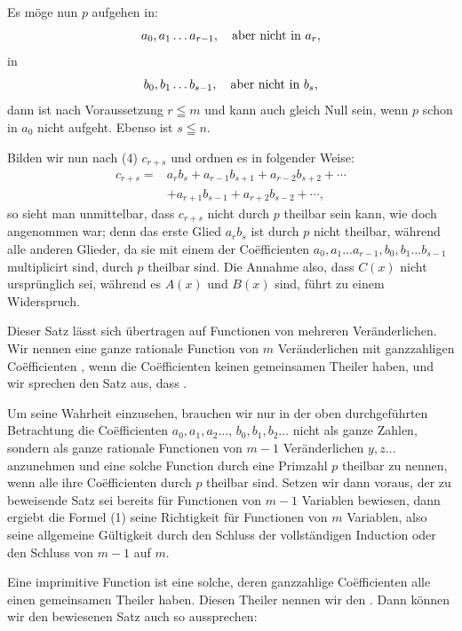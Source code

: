 
Es möge nun $p$ aufgehen in:
\[
 a_0,a_1\ldots a_{r-1},\quad \hbox{aber nicht in }a_r,
\]
in
\[
 b_0,b_1\ldots b_{s-1},\quad \hbox{aber nicht in }b_s,
\]
dann ist nach Voraussetzung $r\leqq m$ und kann auch gleich Null sein,
wenn $p$ schon in $a_0$ nicht aufgeht. Ebenso ist $s\leqq n$.

Bilden wir nun nach (4) $c_{r+s}$ und ordnen es in folgender Weise:
\begin{equation}
\begin{aligned}
 c_{r+s}={}&a_rb_s+a_{r-1}b_{s+1}+a_{r-2}b_{s+2}+\cdots\\
            &+a_{r+1}b_{s-1}+a_{r+2}b_{s-2}+\cdots,
\end{aligned}
\tag{1}
\end{equation}
so sieht man unmittelbar, dass $c_{r+s}$ nicht durch $p$ theilbar sein
kann, wie doch angenommen war; denn das erste Glied $a_rb_s$ ist durch
$p$ nicht theilbar, während alle anderen Glieder, da sie mit einem der
Coëfficienten $a_0,a_1\ldots a_{r-1},b_0,b_1\ldots b_{s-1}$
multiplicirt sind, durch $p$ theilbar sind. Die Annahme also, dass
$C(x)$ nicht ursprünglich sei, während es $A(x)$ und $B(x)$ sind,
führt zu einem Widerspruch.

Dieser Satz lässt sich übertragen auf Functionen von mehreren
Veränderlichen. Wir nennen eine ganze rationale Function von $m$
Veränderlichen mit ganzzahligen Coëfficienten , wenn die Coëfficienten keinen gemeinsamen Theiler
haben, und wir sprechen den Satz aus, dass .

Um seine Wahrheit einzusehen, brauchen wir nur in der oben
durchgeführten Betrachtung die Coëfficienten $a_0,a_1,a_2\ldots$,
$b_0,b_1,b_2\ldots$ nicht als ganze Zahlen, sondern als ganze rationale
Functionen von $m-1$ Veränderlichen $y,z\ldots$ anzunehmen und eine
solche Function durch eine Primzahl $p$ theilbar zu nennen, wenn alle
ihre Coëfficienten durch $p$ theilbar sind. Setzen wir dann voraus, der
zu beweisende Satz sei bereits für Functionen von $m-1$ Variablen
bewiesen, dann ergiebt die Formel (1) seine Richtigkeit für Functionen
von $m$ Variablen, also seine allgemeine Gültigkeit durch den Schluss
der vollständigen Induction oder den Schluss von $m-1$ auf $m$.

Eine imprimitive Function ist eine solche, deren ganzzahlige
Coëfficienten alle einen gemeinsamen Theiler haben. Diesen Theiler
nennen wir den . Dann können wir den
bewiesenen Satz auch so aussprechen:

